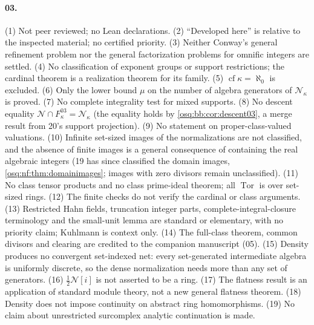 \documentclass[11pt,letterpaper]{article}
\numberwithin{equation}{section}
\theoremstyle{definition}
\theoremstyle{remark}
\theoremstyle{plain}
\newcommand{\NN}{\mathcal N}         %
\newcommand{\Tor}{\operatorname{Tor}}
\newcommand{\cf}{\operatorname{cf}}
\begin{document}
\paragraph{03.} (1) Not peer reviewed; no Lean declarations. (2) ``Developed here'' is relative to the
inspected material; no certified priority. (3) Neither Conway's general refinement problem nor the general factorization problems for omnific
integers are settled.
(4) No classification of exponent groups or support restrictions; the cardinal theorem is a
realization theorem for its family. (5) $\cf\kappa=\aleph_0$ is excluded. (6) Only the lower bound
$\mu$ on the number of algebra generators of $\NN_\kappa$ is proved. (7) No complete integrality test
for mixed supports. (8) No descent equality $\NN\cap F^{03}_\kappa=\NN_\kappa$ (the equality holds by
\cref{osq:bb:cor:descent03}, a merge result from 20's support projection). (9) No statement on
proper-class-valued valuations. (10) Infinite set-sized images of the normalizations are not
classified, and the absence of finite images is a general consequence of containing the real
algebraic integers (19 has since classified the domain images, \cref{osq:nf:thm:domainimages}; images
with zero divisors remain unclassified). (11) No class tensor products and no class prime-ideal theorem; all $\Tor$ is over
set-sized rings. (12) The finite checks do not verify the cardinal or class arguments. (13) Restricted
Hahn fields, truncation integer parts, complete-integral-closure terminology and the small-unit lemma
are standard or elementary, with no priority claim; Kuhlmann is context only. (14) The full-class
theorem, common divisors and clearing are credited to the companion manuscript (05). (15) Density produces no convergent set-indexed net: every set-generated intermediate algebra is
uniformly discrete, so the dense normalization needs more than any set of generators. (16)
$\tfrac12\NN[i]$ is not asserted to be a ring. (17) The flatness result is an application of standard
module theory, not a new general flatness theorem. (18) Density does not impose continuity on abstract
ring homomorphisms. (19) No claim about unrestricted surcomplex analytic continuation is made.
\end{document}

